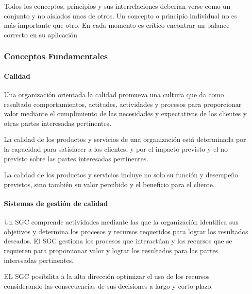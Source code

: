 				\par 
					\noindent Todos los conceptos, principios y sus interrelaciones deberían verse como un conjunto y no aislados
					unos de otros. Un concepto o principio individual no es más importante que otro. En cada momento es
					crítico encontrar un balance correcto en su aplicación
					
			\subsubsection{Conceptos Fundamentales}
				
				\paragraph{Calidad}
					Una organización orientada la calidad promueva una cultura que da como resultado comportamientos,
					actitudes, actividades y procesos para proporcionar valor mediante el cumplimiento de las necesidades y
					expectativas de los clientes y otras partes interesadas pertinentes.
					
					\par 
						\noindent La calidad de los productos y servicios de una organización está determinada por la capacidad para
						satisfacer a los clientes, y por el impacto previsto y el no previsto sobre las partes interesadas
						pertinentes.
						
					\par 
						\noindent La calidad de los productos y servicios incluye no solo su función y desempeño previstos, sino también su valor percibido y el beneficio para el cliente.
					
				\paragraph{Sistemas de gestión de calidad}
					Un SGC comprende actividades mediante las que la organización identifica sus objetivos y determina los
					procesos y recursos requeridos para lograr los resultados deseados.
					El SGC gestiona los procesos que interactúan y los recursos que se requieren para proporcionar valor y
					lograr los resultados para las partes interesadas pertinentes.
					
					\par 
						\noindent EL SGC posibilita a la alta dirección optimizar el uso de los recursos considerando las consecuencias de sus decisiones a largo y corto plazo.
						

